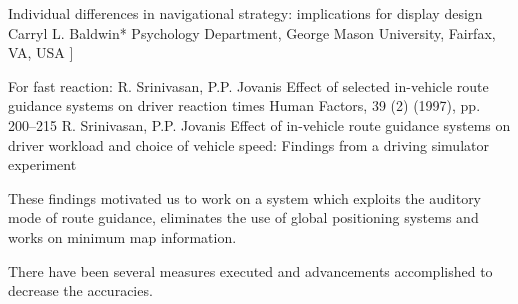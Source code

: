 \documentclass{iitkthesis}
\begin{document}
Individual differences in navigational strategy:
             implications for display design
                      Carryl L. Baldwin*
Psychology Department, George Mason University, Fairfax, VA, USA
]

For fast reaction:
R. Srinivasan, P.P. Jovanis
Effect of selected in-vehicle route guidance systems on driver reaction times
Human Factors, 39 (2) (1997), pp. 200–215
R. Srinivasan, P.P. Jovanis
Effect of in-vehicle route guidance systems on driver workload and choice of vehicle speed: Findings from a driving simulator experiment
\fi

These findings motivated us to work on a system which exploits the auditory mode of route guidance, eliminates the use of global positioning systems and works on minimum map information.
  

 There have been several measures executed and advancements accomplished to decrease the accuracies.
\end{document}
